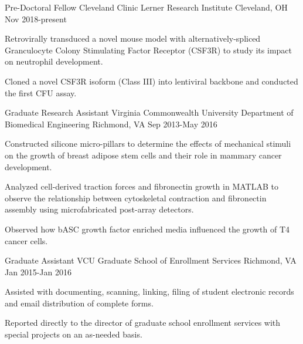 

\begin{cventries}

  \cventry
    {Pre-Doctoral Fellow} %
    {Cleveland Clinic Lerner Research Institute} %
    {Cleveland, OH} %
    {Nov 2018-present} %
    {
      \begin{cvitems} %
        \item {Retrovirally transduced a novel mouse model with alternatively-spliced Granculocyte Colony Stimulating Factor Receptor (CSF3R) to study its impact on neutrophil development.}
        \item {Cloned a novel CSF3R isoform (Class III) into lentiviral backbone and conducted the first CFU assay.} 
      \end{cvitems}
    }

    \cventry
    {Graduate Research Assistant} %
    {Virginia Commonwealth University Department of Biomedical Engineering} %
    {Richmond, VA} %
    {Sep 2013-May 2016} %
    {
      \begin{cvitems} %
        \item {Constructed silicone micro-pillars to determine the effects of mechanical stimuli on the growth of breast adipose stem cells and their role in mammary cancer development.}
        \item {Analyzed cell-derived traction forces and fibronectin growth in MATLAB to observe the relationship between cytoskeletal contraction and fibronectin assembly using microfabricated post-array detectors.}
        \item {Observed how bASC growth factor enriched  media influenced the growth of T4 cancer cells.} 
      \end{cvitems}
    }

    \cventry
    {Graduate Assistant} %
    {VCU Graduate School of Enrollment Services} %
    {Richmond, VA} %
    {Jan 2015-Jan 2016} %
    {
      \begin{cvitems} %
        \item {Assisted with documenting, scanning, linking, filing of student electronic records and email distribution of complete forms.}
        \item {Reported directly to the director of graduate school enrollment services with special projects on an as-needed basis.}
      \end{cvitems}
    }


\end{cventries}
